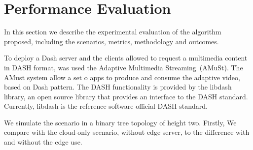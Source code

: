 \section{Performance Evaluation}
\label{sec:results}

In this section we describe the experimental evaluation of the algorithm proposed, including the scenarios, metrics, methodology and outcomes.

To deploy a Dash server and the clients allowed to request a multimedia content in DASH format, was used the Adaptive Multimedia Streaming~(AMuSt). The AMust system allow a set o apps to produce and consume the adaptive video, based on Dash pattern. The DASH functionality is provided by the libdash library, an open source library that provides an interface to the DASH standard. Currently, libdash is the reference software official DASH standard.

We simulate the scenario in a binary tree topology of height two.  Firstly, We compare with the cloud-only scenario, without edge server, to the difference with and without the edge use. 